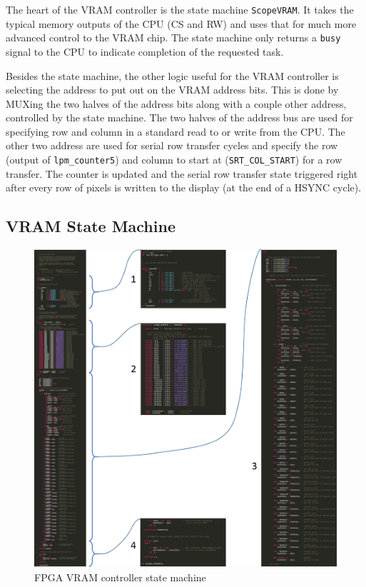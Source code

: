 The heart of the VRAM controller is the state machine \verb=ScopeVRAM=. It takes the typical memory outputs of the CPU (CS and RW) and uses that for much more advanced control to the VRAM chip. The state machine only returns a \verb=busy= signal to the CPU to indicate completion of the requested task.

Besides the state machine, the other logic useful for the VRAM controller is selecting the address to put out on the VRAM address bits. This is done by MUXing the two halves of the address bits along with a couple other address, controlled by the state machine. The two halves of the address bus are used for specifying row and column in a standard read to or write from the CPU. The other two address are used for serial row transfer cycles and specify the row (output of \verb=lpm_counter5=) and column to start at (\verb=SRT_COL_START=) for a row transfer. The counter is updated and the serial row transfer state triggered right after every row of pixels is written to the display (at the end of a HSYNC cycle).

\subsection{VRAM State Machine}

\begin{figure}[ht!]
    \centering
    \includegraphics[width=6in]{fpga_logic/vhdl/vstates.png}
		\caption{FPGA VRAM controller state machine}
\end{figure}

